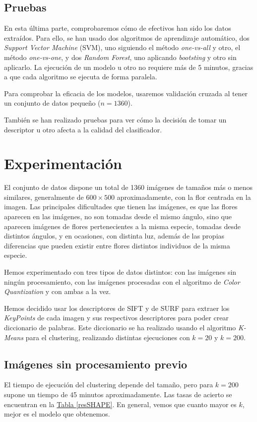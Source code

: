 \documentclass[paper=a4, fontsize=11pt]{article} %
\numberwithin{equation}{section} %
\numberwithin{figure}{section} %
\numberwithin{table}{section} %
\begin{document}
\subsection{Pruebas}

En esta última parte, comprobaremos cómo de efectivos han sido los datos extraídos. Para ello, se han usado dos algoritmos de aprendizaje automático, dos \textit{Support Vector Machine} (SVM), uno siguiendo el método \textit{one-vs-all} y otro, el método \textit{one-vs-one}, y dos \textit{Random Forest}, uno aplicando \textit{bootsting} y otro sin aplicarlo. La ejecución de un modelo u otro no requiere más de 5 minutos, gracias a que cada algoritmo se ejecuta de forma paralela.

Para comprobar la eficacia de los modelos, usaremos validación cruzada al tener un conjunto de datos pequeño ($n=1360$).

También se han realizado pruebas para ver cómo la decisión de tomar un descriptor u otro afecta a la calidad del clasificador.

\section{Experimentación}

El conjunto de datos dispone un total de 1360 imágenes de tamaños más o menos similares, generalmente de $600\times500$ aproximadamente, con la flor centrada en la imagen. Las principales dificultades que tienen las imágenes, es que las flores aparecen en las imágenes, no son tomadas desde el mismo ángulo, sino que aparecen imágenes de flores pertenecientes a la misma especie, tomadas desde distintos ángulos, y en ocasiones, con distinta luz, además de las propias diferencias que pueden existir entre flores distintos individuos de la misma especie.

Hemos experimentado con tres tipos de datos distintos: con las imágenes sin ningún procesamiento, con las imágenes procesadas con el algoritmo de \textit{Color Quantization} y con ambas a la vez.

Hemos decidido usar los descriptores de SIFT y de SURF para extraer los \textit{KeyPoints} de cada imagen y sus respectivos descriptores para poder crear diccionario de palabras. Este diccionario se ha realizado usando el algoritmo \textit{K-Means} para el clustering, realizando distintas ejecuciones con $k=20$ y $k=200$. 

\subsection{Imágenes sin procesamiento previo}
El tiempo de ejecución del clustering depende del tamaño, pero para $k=200$ supone un tiempo de 45 minutos aproximadamente. Las tasas de acierto se encuentran en la \hyperref[resSHAPE]{Tabla \ref*{resSHAPE}}. En general, vemos que cuanto mayor es $k$, mejor es el modelo que obtenemos. 
\end{document}
